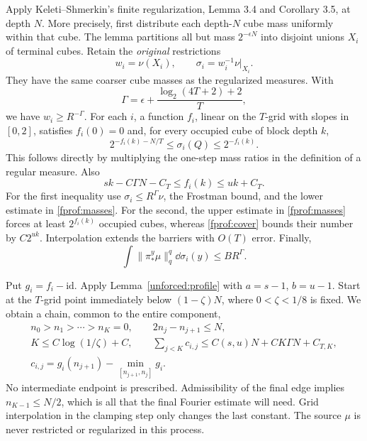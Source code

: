 Apply Keleti--Shmerkin's finite regularization, Lemma 3.4 and Corollary 3.5, at depth \(N\). More precisely, first distribute each depth-\(N\) cube mass uniformly within that cube. The lemma partitions all but mass \(2^{-\epsilon N}\) into disjoint unions \(X_i\) of terminal cubes. Retain the \emph{original} restrictions
$$
 w_i=\nu(X_i),\qquad \sigma_i=w_i^{-1}\nu|_{X_i}.
$$
They have the same coarser cube masses as the regularized measures. With
$$
 \Gamma=\epsilon+\frac{\log_2(4T+2)+2}{T},
$$
we have \(w_i\geq R^{-\Gamma}\). For each \(i\), a function \(f_i\), linear on the \(T\)-grid with slopes in \([0,2]\), satisfies \(f_i(0)=0\) and, for every occupied cube of block depth \(k\),
\begin{equation}\label{fprof:masses}
 2^{-f_i(k)-N/T}\leq\sigma_i(Q)\leq2^{-f_i(k)}.
\end{equation}
This follows directly by multiplying the one-step mass ratios in the definition of a regular measure. Also
\begin{equation}\label{fprof:barriers}
 sk-C\Gamma N-C_T\leq f_i(k)\leq uk+C_T.
\end{equation}
For the first inequality use \(\sigma_i\leq R^\Gamma\nu\), the Frostman bound, and the lower estimate in \eqref{fprof:masses}. For the second, the upper estimate in \eqref{fprof:masses} forces at least \(2^{f_i(k)}\) occupied cubes, whereas \eqref{fprof:cover} bounds their number by \(C2^{uk}\). Interpolation extends the barriers with \(O(T)\) error. Finally,
\begin{equation}\label{fprof:radialcomponent}
 \int\|\pi^y_*\mu\|_q^q\dd\sigma_i(y)\leq B R^\Gamma.
\end{equation}

Put \(g_i=f_i-\mathrm{id}\). Apply Lemma~\ref{unforced:profile} with
\(a=s-1\), \(b=u-1\). Start at the \(T\)-grid point immediately
below \((1-\zeta)N\), where \(0<\zeta<1/8\) is fixed.
We obtain a chain, common to the entire component,
\begin{gather}\label{fprof:levels}
 n_0>n_1>\cdots>n_K=0,\qquad 2n_j-n_{j+1}\le N,\\
 K\le C\log(1/\zeta)+C,\qquad
 \sum_{j<K}c_{i,j}\le C(s,u)N+C K\Gamma N+C_{T,K},\label{fprof:sumcost}\\
 c_{i,j}=g_i(n_{j+1})-\min_{[n_{j+1},n_j]}g_i.\nonumber
\end{gather}
No intermediate endpoint is prescribed. Admissibility of the final edge implies
\(n_{K-1}\le N/2\), which is all that the final Fourier estimate will need.
Grid interpolation in the clamping step only changes the last constant. The source \(\mu\) is never restricted or regularized in this process.

